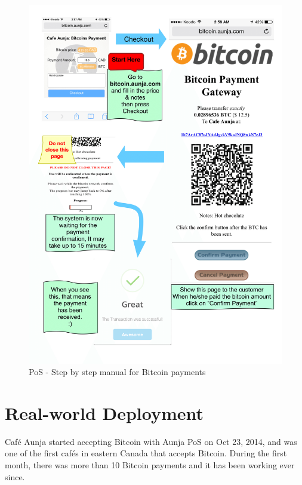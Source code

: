 \begin{figure}[htb!p]
\centering
\includegraphics[width=\linewidth]{fig/Payment_manual.png}
  \caption{PoS - Step by step manual for Bitcoin payments}
\label{fig:payment_manual}
\end{figure}



\section{Real-world Deployment}
Caf\'{e} Aunja started accepting Bitcoin with Aunja PoS on Oct 23, 2014, and was one of the first caf\'{e}s in eastern Canada that accepts Bitcoin. During the first month, there was more than 10 Bitcoin payments and it has been working ever since.

